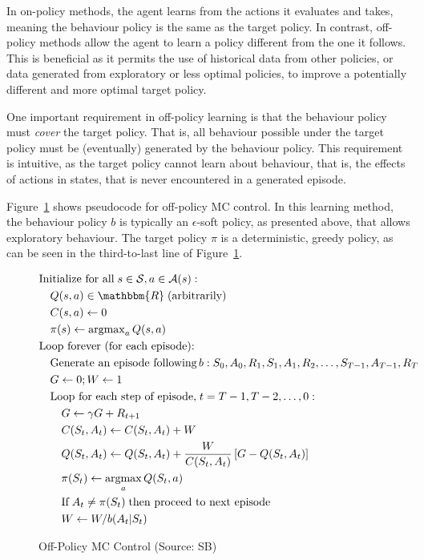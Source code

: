 In on-policy methods, the agent learns from the actions it evaluates and takes, meaning the behaviour policy is the same as the target policy. In contrast, off-policy methods allow the agent to learn a policy different from the one it follows. This is beneficial as it permits the use of historical data from other policies, or data generated from exploratory or less optimal policies, to improve a potentially different and more optimal target policy. 

One important requirement in off-policy learning is that the behaviour policy must \emph{cover} the target policy. That is, all behaviour possible under the target policy must be (eventually) generated by the behaviour policy. This requirement is intuitive, as the target policy cannot learn about behaviour, that is, the effects of actions in states, that is never encountered in a generated episode.

Figure~\ref{fig:offpolicymc} shows pseudocode for off-policy MC control. In this learning method, the behaviour policy $b$ is typically an $\epsilon$-soft policy, as presented above, that allows exploratory behaviour. The target policy $\pi$ is a deterministic, greedy policy, as can be seen in the third-to-last line of Figure~\ref{fig:offpolicymc}.

\begin{figure}
\small
\begin{tcolorbox}[colback=code]
\vspace{-\baselineskip}
\begin{align*}
& \text{Initialize for all}\; s \in \mathcal{S}, a \in \mathcal{A}(s):\\
& \quad Q(s,a) \in \mathbbm{R}\; \text{(arbitrarily)} \\
& \quad C(s, a) \leftarrow 0 \\
& \quad \pi(s) \leftarrow \operatorname{arg max}_a Q(s, a) \\
& \text{Loop forever (for each episode):} \\
& \quad \text{Generate an episode following}\, b: S_0, A_0, R_1, S_1, A_1, R_2, \ldots, S_{T-1}, A_{T-1}, R_{T} \\
& \quad G \leftarrow 0; W \leftarrow 1 \\
& \quad \text{Loop for each step of episode,}\; t = T-1, T-2, \ldots, 0: \\
& \quad \quad G \leftarrow \gamma G + R_{t+1} \\
& \quad \quad C(S_t, A_t) \leftarrow C(S_t, A_t) + W \\
& \quad \quad Q(S_t, A_t) \leftarrow Q(S_t, A_t) + \frac{W}{C(S_t, A_t)} \left[ G - Q(S_t, A_t) \right] \\
& \quad \quad \pi(S_t) \leftarrow \operatorname*{arg max}_a Q(S_t, a) \\
& \quad \quad \text{If}\; A_t \neq \pi(S_t) \; \text{then proceed to next episode} \\
& \quad \quad W \leftarrow W / b(A_t | S_t)
\end{align*}
\end{tcolorbox}
\caption[Off-Policy MC Control]{Off-Policy MC Control (Source: SB)}
\label{fig:offpolicymc}
\end{figure}

